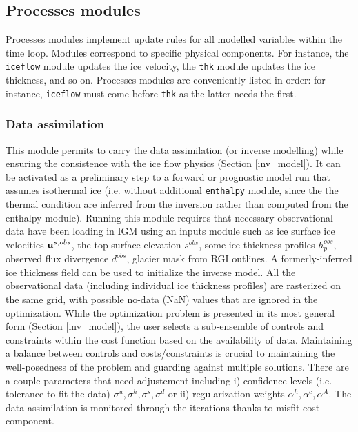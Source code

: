 \documentclass[gmd]{copernicus}
\begin{document}
\subsection{Processes modules}

Processes modules implement update rules for all modelled variables within the time loop. Modules correspond to specific physical components. For instance, the \texttt{iceflow} module updates the ice velocity, the \texttt{thk} module updates the ice thickness, and so on. Processes modules are conveniently listed in order: for instance, \texttt{iceflow} must come before \texttt{thk} as the latter needs the first.

\subsubsection{Data assimilation}
\label{data_assimilation}

This module permits to carry the data assimilation (or inverse modelling) while ensuring the consistence with the ice flow physics (Section \ref{inv_model}). It can be activated as a preliminary step to a forward or prognostic model run that assumes isothermal ice (i.e. without additional \texttt{enthalpy} module, since the the thermal condition are inferred from the inversion rather than computed from the enthalpy module). Running this module requires that necessary observational data have been loading in IGM using an inputs module such as ice surface ice velocities ${\bf u}^{s,obs}$, the top surface elevation $s^{obs}$, some ice thickness profiles $h_p^{obs}$, observed flux divergence $d^{obs}$, glacier mask from RGI outlines. A formerly-inferred ice thickness field \citep{farinotti2019consensus,millan2022ice} can be used to initialize the inverse model. All the observational data (including individual ice thickness profiles) are rasterized on the same grid, with possible no-data (NaN) values that are ignored in the optimization. While the optimization problem is presented in its most general form (Section \ref{inv_model}), the user selects a sub-ensemble of controls and constraints within the cost function based on the availability of data. Maintaining a balance between controls and costs/constraints is crucial to maintaining the well-posedness of the problem and guarding against multiple solutions. There are a couple parameters that need adjustement including i) confidence levels (i.e. tolerance to fit the data) $\sigma^u, \sigma^h, \sigma^s, \sigma^d$ or ii) regularization weights $\alpha^h, \alpha^c, \alpha^A$. The data assimilation is monitored through the iterations thanks to misfit cost component. 
\end{document}
